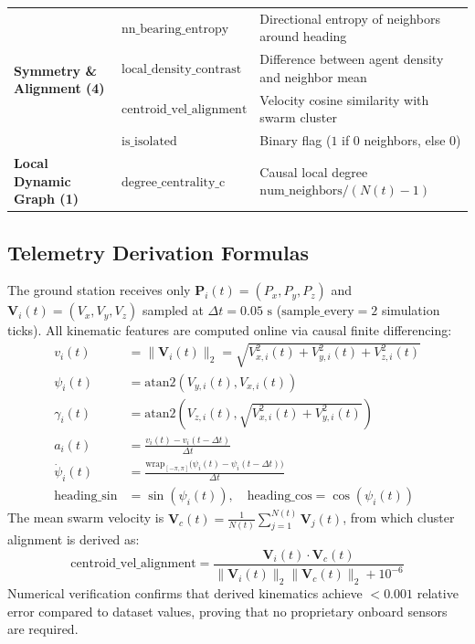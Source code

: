 \documentclass[9pt]{ieeeconf}
\begin{document}
\begin{table}[h]
\begin{tabularx}{\columnwidth}{l l X}
\midrule
\multirow{4}{*}{\textbf{Symmetry \& Alignment (4)}} 
& $\text{nn\_bearing\_entropy}$ & Directional entropy of neighbors around heading \\
& $\text{local\_density\_contrast}$ & Difference between agent density and neighbor mean \\
& $\text{centroid\_vel\_alignment}$ & Velocity cosine similarity with swarm cluster \\
& $\text{is\_isolated}$ & Binary flag ($1$ if 0 neighbors, else $0$) \\
\midrule
\textbf{Local Dynamic Graph (1)} 
& $\text{degree\_centrality\_c}$ & Causal local degree $\text{num\_neighbors} / (N(t) - 1)$ \\
\bottomrule
\end{tabularx}
\end{table}

\subsection{Telemetry Derivation Formulas}
The ground station receives only $\mathbf{P}_i(t) = (P_x, P_y, P_z)$ and $\mathbf{V}_i(t) = (V_x, V_y, V_z)$ sampled at $\Delta t = 0.05\text{ s}$ ($\text{sample\_every} = 2$ simulation ticks). All kinematic features are computed online via causal finite differencing:
\begin{align}
v_i(t) &= \|\mathbf{V}_i(t)\|_2 = \sqrt{V_{x,i}^2(t) + V_{y,i}^2(t) + V_{z,i}^2(t)} \\
\psi_i(t) &= \text{atan2}(V_{y,i}(t), V_{x,i}(t)) \\
\gamma_i(t) &= \text{atan2}\left(V_{z,i}(t), \sqrt{V_{x,i}^2(t) + V_{y,i}^2(t)}\right) \\
a_i(t) &= \frac{v_i(t) - v_i(t - \Delta t)}{\Delta t} \\
\dot{\psi}_i(t) &= \frac{\text{wrap}_{[-\pi, \pi]}\big(\psi_i(t) - \psi_i(t - \Delta t)\big)}{\Delta t} \\
\text{heading\_sin} &= \sin(\psi_i(t)), \quad \text{heading\_cos} = \cos(\psi_i(t))
\end{align}
The mean swarm velocity is $\mathbf{V}_c(t) = \frac{1}{N(t)}\sum_{j=1}^{N(t)}\mathbf{V}_j(t)$, from which cluster alignment is derived as:
\begin{equation}
\text{centroid\_vel\_alignment} = \frac{\mathbf{V}_i(t) \cdot \mathbf{V}_c(t)}{\|\mathbf{V}_i(t)\|_2 \|\mathbf{V}_c(t)\|_2 + 10^{-6}}
\end{equation}
Numerical verification confirms that derived kinematics achieve $<0.001$ relative error compared to dataset values, proving that no proprietary onboard sensors are required.
\end{document}
